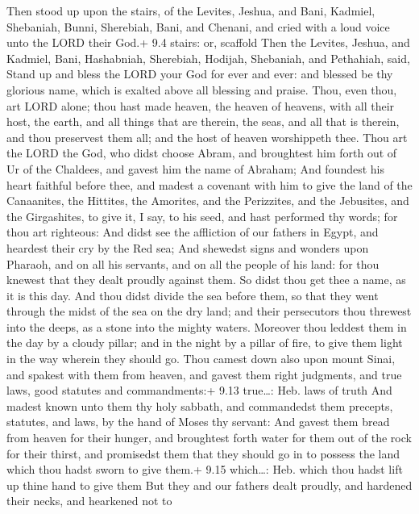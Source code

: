  Then stood up upon the stairs, of the Levites, Jeshua,
and Bani, Kadmiel, Shebaniah, Bunni, Sherebiah, Bani, and Chenani, and
cried with a loud voice unto the LORD their God.+ 9.4 stairs: or,
scaffold  Then the Levites, Jeshua, and Kadmiel, Bani,
Hashabniah, Sherebiah, Hodijah, Shebaniah, and Pethahiah, said, Stand up
and bless the LORD your God for ever and ever: and blessed be thy
glorious name, which is exalted above all blessing and praise.
 Thou, even thou, art LORD alone; thou hast made heaven, the
heaven of heavens, with all their host, the earth, and all things that
are therein, the seas, and all that is therein, and thou preservest them
all; and the host of heaven worshippeth thee.  Thou art the
LORD the God, who didst choose Abram, and broughtest him forth out of Ur
of the Chaldees, and gavest him the name of Abraham;  And
foundest his heart faithful before thee, and madest a covenant with him
to give the land of the Canaanites, the Hittites, the Amorites, and the
Perizzites, and the Jebusites, and the Girgashites, to give it, I say,
to his seed, and hast performed thy words; for thou art righteous:
 And didst see the affliction of our fathers in Egypt, and
heardest their cry by the Red sea;  And shewedst signs and
wonders upon Pharaoh, and on all his servants, and on all the people of
his land: for thou knewest that they dealt proudly against them. So
didst thou get thee a name, as it is this day.  And thou
didst divide the sea before them, so that they went through the midst of
the sea on the dry land; and their persecutors thou threwest into the
deeps, as a stone into the mighty waters.  Moreover thou
leddest them in the day by a cloudy pillar; and in the night by a pillar
of fire, to give them light in the way wherein they should go.
 Thou camest down also upon mount Sinai, and spakest with
them from heaven, and gavest them right judgments, and true laws, good
statutes and commandments:+ 9.13 true\ldots: Heb. laws of truth
 And madest known unto them thy holy sabbath, and
commandedst them precepts, statutes, and laws, by the hand of Moses thy
servant:  And gavest them bread from heaven for their
hunger, and broughtest forth water for them out of the rock for their
thirst, and promisedst them that they should go in to possess the land
which thou hadst sworn to give them.+ 9.15 which\ldots: Heb. which thou
hadst lift up thine hand to give them  But they and our
fathers dealt proudly, and hardened their necks, and hearkened not to

